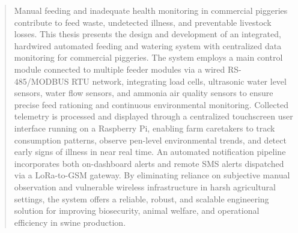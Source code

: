 \begin{abstract}
Manual feeding and inadequate health monitoring in commercial piggeries contribute to feed waste, undetected illness, and preventable livestock losses. This thesis presents the design and development of an integrated, hardwired automated feeding and watering system with centralized data monitoring for commercial piggeries. The system employs a main control module connected to multiple feeder modules via a wired RS-485/MODBUS RTU network, integrating load cells, ultrasonic water level sensors, water flow sensors, and ammonia air quality sensors to ensure precise feed rationing and continuous environmental monitoring. Collected telemetry is processed and displayed through a centralized touchscreen user interface running on a Raspberry Pi, enabling farm caretakers to track consumption patterns, observe pen-level environmental trends, and detect early signs of illness in near real time. An automated notification pipeline incorporates both on-dashboard alerts and remote SMS alerts dispatched via a LoRa-to-GSM gateway. By eliminating reliance on subjective manual observation and vulnerable wireless infrastructure in harsh agricultural settings, the system offers a reliable, robust, and scalable engineering solution for improving biosecurity, animal welfare, and operational efficiency in swine production.
\end{abstract}

